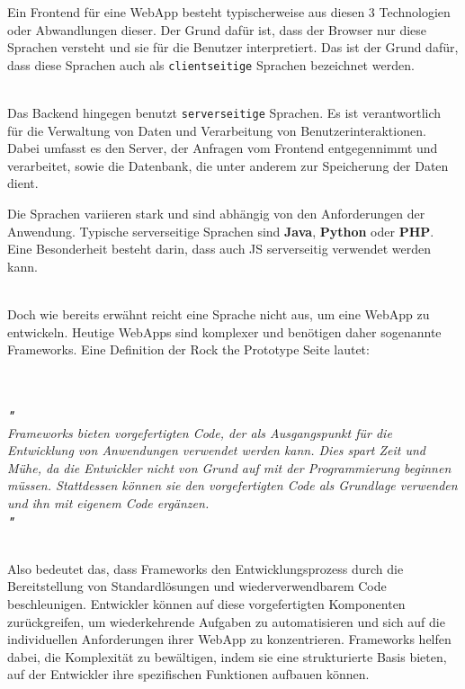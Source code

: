\documentclass[biblatex]{lni}
\begin{document}
Ein Frontend für eine WebApp besteht typischerweise aus diesen 3 Technologien oder Abwandlungen dieser. \cite{CoU}
Der Grund dafür ist, dass der Browser nur diese Sprachen versteht und sie für die Benutzer interpretiert.
Das ist der Grund dafür, dass diese Sprachen auch als \texttt{clientseitige} Sprachen bezeichnet werden.

\\

Das Backend hingegen benutzt \texttt{serverseitige} Sprachen. \cite{CMSRev}
Es ist verantwortlich für die Verwaltung von Daten und Verarbeitung von Benutzerinteraktionen.
Dabei umfasst es den Server, der Anfragen vom Frontend entgegennimmt und verarbeitet,
sowie die Datenbank, die unter anderem zur Speicherung der Daten dient.

Die Sprachen variieren stark und sind abhängig von den Anforderungen der Anwendung.
Typische serverseitige Sprachen sind \textbf{Java}, \textbf{Python} oder \textbf{PHP}.
Eine Besonderheit besteht darin, dass auch \ac{JS} serverseitig verwendet werden kann.

\\

Doch wie bereits erwähnt reicht eine Sprache nicht aus, um eine WebApp zu entwickeln.
Heutige WebApps sind komplexer und benötigen daher sogenannte Frameworks.
Eine Definition der Rock the Prototype Seite lautet: \\
\begin{minipage}{\textwidth}
  \textit{
    \\
    \\
    \textbf{"} \\
    Frameworks bieten vorgefertigten Code,
    der als Ausgangspunkt für die Entwicklung von Anwendungen verwendet werden kann. Dies spart Zeit und Mühe,
    da die Entwickler nicht von Grund auf mit der Programmierung beginnen müssen.
    Stattdessen können sie den vorgefertigten Code als Grundlage verwenden und ihn mit eigenem Code ergänzen.
    \\
    \textbf{"} \\
    \Cite{RtP}
    \\
  }
\end{minipage}

Also bedeutet das,
dass Frameworks den Entwicklungsprozess durch die Bereitstellung von Standardlösungen und wiederverwendbarem Code beschleunigen.
Entwickler können auf diese vorgefertigten Komponenten zurückgreifen,
um wiederkehrende Aufgaben zu automatisieren und sich auf die individuellen Anforderungen ihrer WebApp zu konzentrieren.
Frameworks helfen dabei, die Komplexität zu bewältigen,
indem sie eine strukturierte Basis bieten, auf der Entwickler ihre spezifischen Funktionen aufbauen können.
\end{document}
